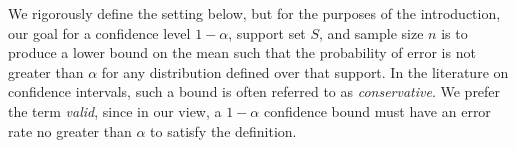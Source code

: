 \documentclass{article}
\theoremstyle{definition}
\theoremstyle{remark}
\begin{document}
We rigorously define the setting below, but for the purposes of the introduction, our goal for a confidence level $1-\alpha$, support set $S$, and sample size $n$ is to produce a lower bound on the mean such that the probability of error is not greater than $\alpha$ for any distribution defined over that support. In the literature on confidence intervals, such a bound is often referred to as {\em conservative}. We prefer the term {\em valid}, since in our view, a $1-\alpha$ confidence bound must have an error rate no greater than $\alpha$ to satisfy the definition. 

\end{document}
